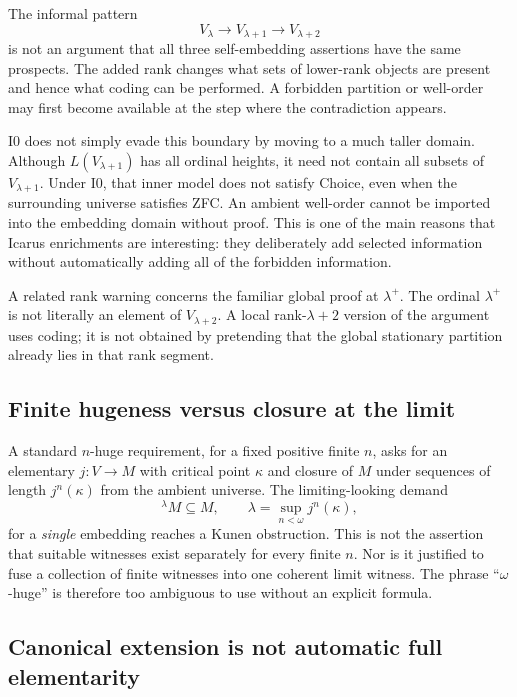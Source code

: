 \documentclass[11pt,letterpaper]{article}
\theoremstyle{definition}
\newcommand{\Izero}{\mathrm{I0}}
\begin{document}
The informal pattern
\[
 V_\lambda\longrightarrow V_{\lambda+1}\longrightarrow V_{\lambda+2}
\]
is not an argument that all three self-embedding assertions have the same prospects. The added rank changes what sets of lower-rank objects are present and hence what coding can be performed. A forbidden partition or well-order may first become available at the step where the contradiction appears.

$\Izero$ does not simply evade this boundary by moving to a much taller domain. Although $L(V_{\lambda+1})$ has all ordinal heights, it need not contain all subsets of $V_{\lambda+1}$. Under $\Izero$, that inner model does not satisfy Choice, even when the surrounding universe satisfies ZFC. An ambient well-order cannot be imported into the embedding domain without proof. This is one of the main reasons that Icarus enrichments are interesting: they deliberately add selected information without automatically adding all of the forbidden information. \cite{dimonte}

A related rank warning concerns the familiar global proof at $\lambda^+$. The ordinal $\lambda^+$ is not literally an element of $V_{\lambda+2}$. A local rank-$\lambda+2$ version of the argument uses coding; it is not obtained by pretending that the global stationary partition already lies in that rank segment.

\subsection{Finite hugeness versus closure at the limit}

A standard $n$-huge requirement, for a fixed positive finite $n$, asks for an elementary $j:V\to M$ with critical point $\kappa$ and closure of $M$ under sequences of length $j^n(\kappa)$ from the ambient universe. The limiting-looking demand
\[
 {}^\lambda M\subseteq M,
 \qquad \lambda=\sup_{n<\omega}j^n(\kappa),
\]
for a \emph{single} embedding reaches a Kunen obstruction. This is not the assertion that suitable witnesses exist separately for every finite $n$. Nor is it justified to fuse a collection of finite witnesses into one coherent limit witness. The phrase ``$\omega$-huge'' is therefore too ambiguous to use without an explicit formula. \cite{dimonte,goldberge}

\subsection{Canonical extension is not automatic full elementarity}
\end{document}
